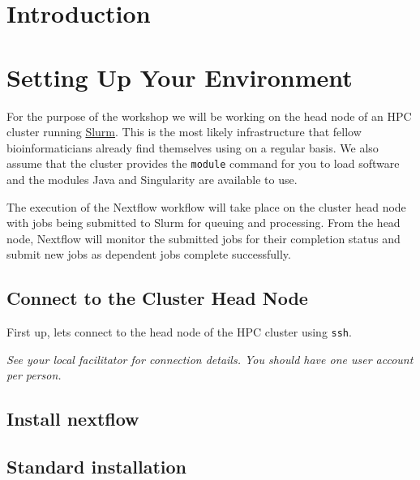 \newpage

\section{Introduction}


\newpage

\section{Setting Up Your Environment}

For the purpose of the workshop we will be working on the head node of an HPC cluster running \href{https://slurm.schedmd.com/documentation.html}{Slurm}.
This is the most likely infrastructure that fellow bioinformaticians already find themselves using
on a regular basis. We also assume that the cluster provides the \texttt{module} command for you to
load software and the modules Java and Singularity are available to use.

The execution of the Nextflow workflow will take place on the cluster head node with jobs
being submitted to Slurm for queuing and processing. From the head node, Nextflow will monitor the
submitted jobs for their completion status and submit new jobs as dependent jobs complete successfully.


\subsection{Connect to the Cluster Head Node}

\begin{steps}
First up, lets connect to the head node of the HPC cluster using \texttt{ssh}.

\emph{See your local facilitator for connection details. You should have one user account per person.}

\end{steps}

\newpage 

\subsection{Install nextflow}

\subsection{Standard installation}

